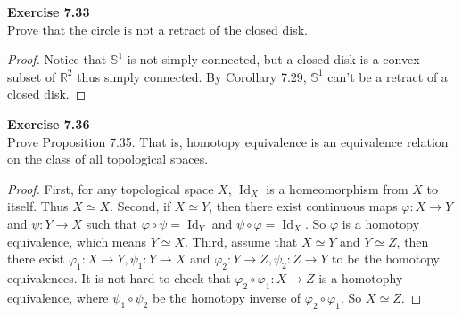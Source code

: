 \documentclass[12pt, a4paper]{article}
\theoremstyle{plain}
\newcommand{\R}{\mathbb{R}}
\newcommand{\mS}{\mathbb{S}}
\def\phi{\varphi}
\DeclareMathOperator{\Id}{Id}
\newenvironment{exercise}[2][Exercise]
    { \begin{mdframed}[backgroundcolor=gray!20] \textbf{#1 #2} \\}
    {  \end{mdframed}}
\begin{document}
\begin{exercise}{7.33}
    Prove that the circle is not a retract of the closed disk.
\end{exercise}
    \begin{proof}
        Notice that $\mS^1$ is not simply connected, but a closed disk is a convex subset of $\R^2$ thus simply connected. By Corollary 7.29, $\mS^1$ can't be a retract of a closed disk.
    \end{proof}

\begin{exercise}{7.36}
    Prove Proposition 7.35. That is, homotopy equivalence is an equivalence relation on the class of all topological spaces.
\end{exercise}
    \begin{proof}
        First, for any topological space $X$, $\Id_X$ is a homeomorphism from $X$ to itself. Thus $X\simeq X$. Second, if $X\simeq Y$, then there exist continuous maps $\varphi\colon X\to Y$ and $\psi\colon Y\to X$ such that $\varphi\circ \psi = \Id_Y$ and $\psi\circ \varphi = \Id_X$. So $\phi$ is a homotopy equivalence, which means $Y\simeq X$. Third, assume that $X\simeq Y$ and $Y\simeq Z$, then there exist $\varphi_1\colon X\to Y, \psi_1\colon Y\to X$ and $\varphi_2\colon Y\to Z, \psi_2\colon Z\to Y$ to be the homotopy equivalences. It is not hard to check that $\varphi_2\circ \varphi_1\colon X\to Z$ is a homotophy equivalence, where $\psi_1\circ \psi_2$ be the homotopy inverse of $\varphi_2\circ \varphi_1$. So $X\simeq Z$.
    \end{proof}
\end{document}

